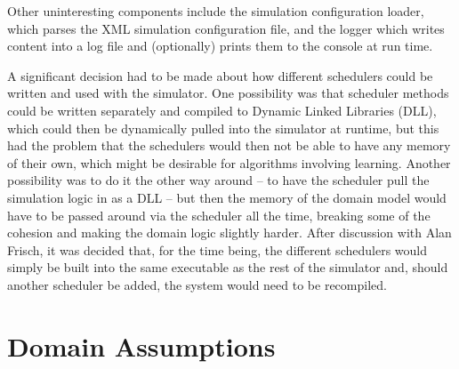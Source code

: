\documentclass{UoYCSproject}
\begin{document}
Other uninteresting components include the simulation configuration loader, which parses the XML simulation configuration file, and the logger which writes content into a log file and (optionally) prints them to the console at run time.

A significant decision had to be made about how different schedulers could be written and used with the simulator.  One possibility was that scheduler methods could be written separately and compiled to Dynamic Linked Libraries (DLL), which could then be dynamically pulled into the simulator at runtime, but this had the problem that the schedulers would then not be able to have any memory of their own, which might be desirable for algorithms involving learning.  Another possibility was to do it the other way around -- to have the scheduler pull the simulation logic in as a DLL -- but then the memory of the domain model would have to be passed around via the scheduler all the time, breaking some of the cohesion and making the domain logic slightly harder.  After discussion with Alan Frisch, it was decided that, for the time being, the different schedulers would simply be built into the same executable as the rest of the simulator and, should another scheduler be added, the system would need to be recompiled.

\section{Domain Assumptions}
\end{document}
